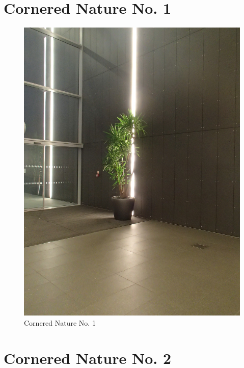\documentclass{book}
\begin{document}
\chapter{Cornered Nature No. 1}

\begin{figure}
\centering
\includegraphics[width=\textwidth,angle=-90]{figures/P1050156.JPG}
\caption{Cornered Nature No. 1}
\end{figure}

\chapter{Cornered Nature No. 2}
\end{document}
